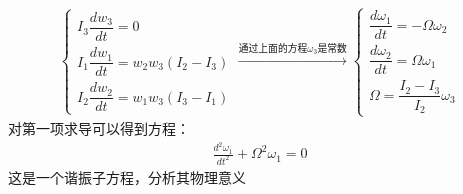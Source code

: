 \documentclass[UTF8,10pt]{article}
\begin{document}
\begin{gather*}
    \begin{cases}
        I_{3} \dfrac{d w_{3}}{d t}=0                                   \\[0.3cm]
        I_{1} \dfrac{d w_{1}}{d t}=w_{2} w_{3}\left(I_{2}-I_{3}\right) \\[0.3cm]
        I_{2} \dfrac{d w_{2}}{d t}=w_{1} w_{3}\left(I_{3}-I_{1}\right)
    \end{cases}
    \xrightarrow{\text{通过上面的方程$\omega_3$是常数}}
    \begin{cases}
        \dfrac{d\omega_1}{dt}=-\Omega \omega_2 \\[0.3cm]
        \dfrac{d\omega_2}{dt}=\Omega \omega_1  \\[0.3cm]
        \Omega=\dfrac{I_2-I_3}{I_2}\omega_3
    \end{cases}
\end{gather*}
对第一项求导可以得到方程：
\begin{align*}
    \frac{d^2\omega_1}{dt^2}+\Omega^2\omega_1=0
\end{align*}
这是一个谐振子方程，分析其物理意义
\end{document}
